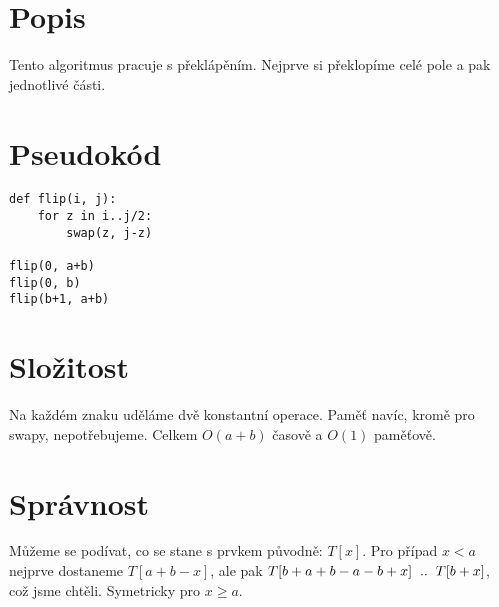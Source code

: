 \documentclass[a4paper]{article}
\begin{document}
\pagebreak

\section*{Popis}
Tento algoritmus pracuje s překlápěním. Nejprve si překlopíme celé pole a pak jednotlivé části.

\section*{Pseudokód}
\begin{lstlisting}
def flip(i, j):
	for z in i..j/2:
		swap(z, j-z)

flip(0, a+b)
flip(0, b)
flip(b+1, a+b)
\end{lstlisting}

\section*{Složitost}
Na každém znaku uděláme dvě konstantní operace. Paměť navíc, kromě pro swapy, nepotřebujeme. Celkem $O(a+b)$ časově a $O(1)$ paměťově.

\section*{Správnost}
Můžeme se podívat, co se stane s prvkem původně: $T[x]$. Pro případ $x < a$ nejprve dostaneme $T[a+b-x]$, ale pak $T[b + a+b - a - b + x]\hspace{0.2cm}..\hspace{0.2cm}T[b+x]$, což jsme chtěli. Symetricky pro $x \ge a$.
\end{document}
